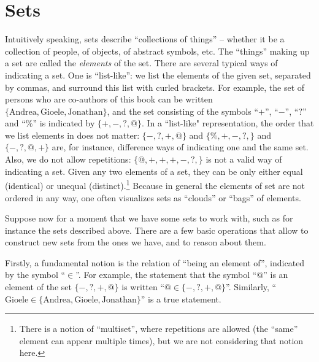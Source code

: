 

\section{Sets}


Intuitively speaking, sets describe ``collections of things'' -- whether it be a collection of people, of objects, of abstract symbols, etc.
The ``things'' making up a set are called the \emph{elements} of the set.
There are several typical ways of indicating a set. One is ``list-like'':
we list the elements of the given set, separated by commas, and surround this list with curled brackets.
For example, the set of persons who are co-authors of this book can be written $\{ \text{Andrea}, \text{Gioele}, \text{Jonathan} \}$, and the set consisting of the symbols ``$+$'', ``$-$'', ``$?$'' and ``$\%$'' is indicated by $\{ +, -, ?, @ \}$. In a ``list-like" representation, the order that we list elements in does not matter: $\{ -, ?, +, @ \}$ and $\{ \%, +, -, ?, \}$ and $\{ -, ?, @, + \}$ are, for instance, difference ways of indicating one and the same set. Also, we do not allow repetitions: $\{ @, +, +, +, -, ?, \}$ is not a valid way of indicating a set. Given any two elements of a set, they can be only either equal (identical) or unequal (distinct).\footnote{There is a notion of ``multiset'', where repetitions are allowed (the ``same'' element can appear multiple times), but we are not considering that notion here.} Because in general the elements of set are not ordered in any way, one often visualizes sets as ``clouds'' or ``bags'' of elements.


Suppose now for a moment that we have some sets to work with, such as for instance the sets described above.
There are a few basic operations that allow to construct new sets from the ones we have, and to reason about them.


Firstly, a fundamental notion is the relation of ``being an element of'', indicated by the symbol ``$\in$''.
For example, the statement that the symbol ``$@$'' is an element of the set $\{ -, ?, +, @ \}$ is written ``$@ \in \{ -, ?, +, @ \}$''.
Similarly, ``$\text{Gioele} \in \{ \text{Andrea}, \text{Gioele}, \text{Jonathan} \}$'' is a true statement.

